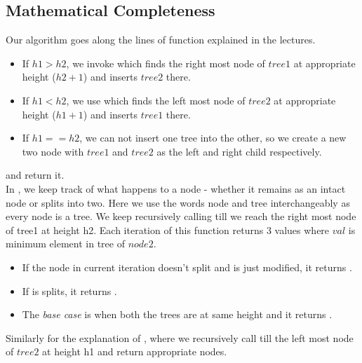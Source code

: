 \subsection{Mathematical Completeness}
Our algorithm goes along the lines of  function explained in the lectures. 
\begin{itemize}
    \item If $h1 > h2$, we invoke  which finds the right most node of $tree1$ at appropriate height ($h2+1$) and inserts $tree2$ there.
    \item If $h1 < h2$, we use  which finds the left most node of $tree2$ at appropriate height ($h1+1$) and inserts $tree1$ there.
    \item If $h1 == h2$, we can not insert one tree into the other, so we create a new two node with $tree1$ and $tree2$ as the left and right child respectively.
\end{itemize}
and return it. \\
In , we keep track of what happens to a node - whether it remains as an intact node or splits into two.
Here we use the words node and tree interchangeably as every node is a tree. We keep recursively calling till we reach the right most node of tree1 at height h2. Each iteration of this function returns 3 values  where $val$ is minimum element in tree of $node2$. 
\begin{itemize}
    \item If the node in current iteration doesn't split and is just modified, it returns .
    \item If is splits, it returns .
    \item The \textit{base case} is when both the trees are at same height and it returns . 
\end{itemize}  
Similarly for the explanation of , where we recursively call till the left most node of $tree2$ at height h1 and return appropriate nodes.
